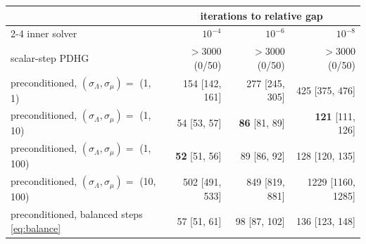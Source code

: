 \begin{tabular}{l rrr}
\toprule
 & \multicolumn{3}{c}{iterations to relative gap} \\
\cmidrule(lr){2-4}
inner solver & $10^{-4}$ & $10^{-6}$ & $10^{-8}$ \\
\midrule
scalar-step PDHG & $>3000$ (0/50) & $>3000$ (0/50) & $>3000$ (0/50) \\
preconditioned, $(\sigma_\Lambda,\sigma_\mu)=$ (1, 1) & 154 [142, 161] & 277 [245, 305] & 425 [375, 476] \\
preconditioned, $(\sigma_\Lambda,\sigma_\mu)=$ (1, 10) & 54 [53, 57] & \textbf{86} [81, 89] & \textbf{121} [111, 126] \\
preconditioned, $(\sigma_\Lambda,\sigma_\mu)=$ (1, 100) & \textbf{52} [51, 56] & 89 [86, 92] & 128 [120, 135] \\
preconditioned, $(\sigma_\Lambda,\sigma_\mu)=$ (10, 100) & 502 [491, 533] & 849 [819, 881] & 1229 [1160, 1285] \\
preconditioned, balanced steps \eqref{eq:balance} & 57 [51, 61] & 98 [87, 102] & 136 [123, 148] \\
\bottomrule
\end{tabular}
